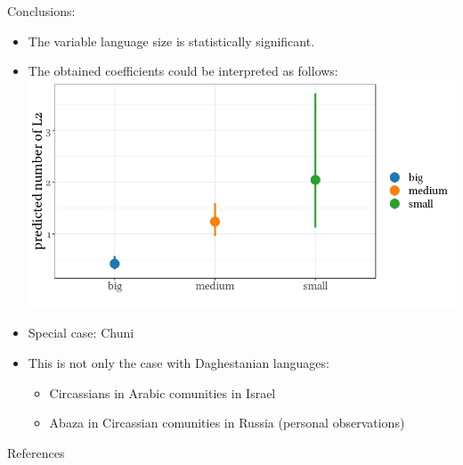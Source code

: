 \documentclass[13pt, t]{beamer}
\begin{document}
\begin{frame}{Conclusions:}
\begin{itemize}
\item The variable language size is statistically significant.
\item The obtained coefficients could be interpreted as follows:\\
\includegraphics[width=\linewidth]{images/15_predicted_750_400} \pause
\item Special case: Chuni \pause
\item This is not only the case with Daghestanian languages:
\begin{itemize}
\item Circassians in Arabic comunities in Israel \citep{kreindler95}
\item Abaza in Circassian comunities in Russia (personal observations)
\end{itemize}
\end{itemize}
\end{frame}


\begin{frame}{References}
\footnotesize


\end{frame}
\end{document}
